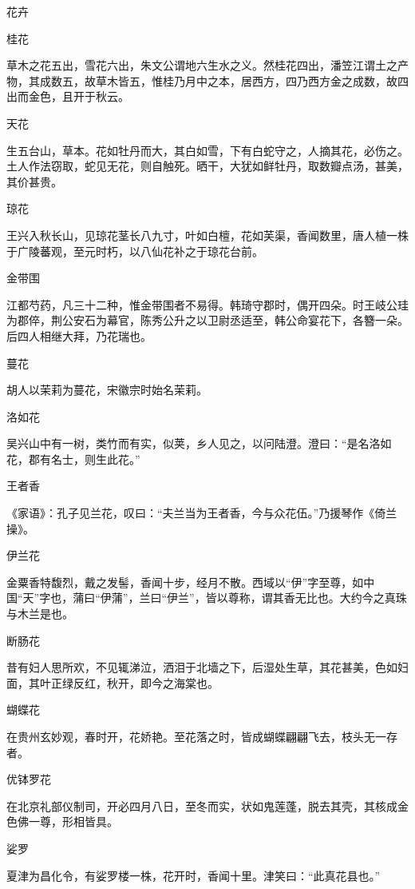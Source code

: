 \documentclass[a4paper,12pt,UTF8,twoside]{ctexbook}
\begin{document}
    花卉
    
    桂花
    
    草木之花五出，雪花六出，朱文公谓地六生水之义。然桂花四出，潘笠江谓土之产物，其成数五，故草木皆五，惟桂乃月中之本，居西方，四乃西方金之成数，故四出而金色，且开于秋云。
    
    天花
    
    生五台山，草本。花如牡丹而大，其白如雪，下有白蛇守之，人摘其花，必伤之。土人作法窃取，蛇见无花，则自触死。晒干，大犹如鲜牡丹，取数瓣点汤，甚美，其价甚贵。
    
    琼花
    
    王兴入秋长山，见琼花茎长八九寸，叶如白檀，花如芙渠，香闻数里，唐人植一株于广陵蕃观，至元时朽，以八仙花补之于琼花台前。
    
    金带围
    
    江都芍药，凡三十二种，惟金带围者不易得。韩琦守郡时，偶开四朵。时王岐公珪为郡倅，荆公安石为幕官，陈秀公升之以卫尉丞适至，韩公命宴花下，各簪一朵。后四人相继大拜，乃花瑞也。
    
    蔓花
    
    胡人以茉莉为蔓花，宋徽宗时始名茉莉。
    
    洛如花
    
    吴兴山中有一树，类竹而有实，似荚，乡人见之，以问陆澄。澄曰：“是名洛如花，郡有名士，则生此花。”
    
    王者香
    
    《家语》：孔子见兰花，叹曰：“夫兰当为王者香，今与众花伍。”乃援琴作《倚兰操》。
    
    伊兰花
    
    金粟香特馥烈，戴之发髻，香闻十步，经月不散。西域以“伊”字至尊，如中国“天”字也，蒲曰“伊蒲”，兰曰“伊兰”，皆以尊称，谓其香无比也。大约今之真珠与木兰是也。
    
    断肠花
    
    昔有妇人思所欢，不见辄涕泣，洒泪于北墙之下，后湿处生草，其花甚美，色如妇面，其叶正绿反红，秋开，即今之海棠也。
    
    蝴蝶花
    
    在贵州玄妙观，春时开，花娇艳。至花落之时，皆成蝴蝶翩翩飞去，枝头无一存者。
    
    优钵罗花
    
    在北京礼部仪制司，开必四月八日，至冬而实，状如鬼莲蓬，脱去其壳，其核成金色佛一尊，形相皆具。
    
    娑罗
    
    夏津为昌化令，有娑罗楼一株，花开时，香闻十里。津笑曰：“此真花县也。”
    
\end{document}

